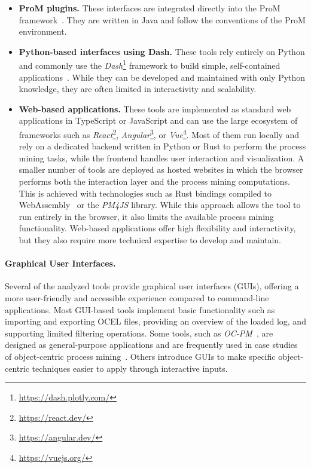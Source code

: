 \begin{itemize}
	\item \textbf{ProM plugins.}
	      These interfaces are integrated directly into the ProM framework~\cite{prom, oclpm, constraintchecking}.
	      They are written in Java and follow the conventions of the ProM environment.
	\item \textbf{Python-based interfaces using Dash.}
	      These tools rely entirely on Python and commonly use the \textit{Dash}\footnote{\url{https://dash.plotly.com/}} framework to build simple, self-contained applications~\cite{qrpm, ocpm}.
	      While they can be developed and maintained with only Python knowledge, they are often limited in interactivity and scalability.
	\item \textbf{Web-based applications.}
	      These tools are implemented as standard web applications in TypeScript or JavaScript and can use the large ecosystem of frameworks such as \textit{React}\footnote{\url{https://react.dev/}}, \textit{Angular}\footnote{\url{https://angular.dev/}}, or \textit{Vue}\footnote{\url{https://vuejs.org/}}. Most of them run locally and rely on a dedicated backend written in Python or Rust to perform the process mining tasks, while the frontend handles user interaction and visualization.
	      A smaller number of tools are deployed as hosted websites in which the browser performs both the interaction layer and the process mining computations. This is achieved with technologies such as Rust bindings compiled to WebAssembly~\cite{rust4pm} or the \textit{PM4JS} library. While this approach allows the tool to run entirely in the browser, it also limits the available process mining functionality.
	      Web-based applications offer high flexibility and interactivity, but they also require more technical expertise to develop and maintain.
\end{itemize}

\paragraph{Graphical User Interfaces.}

Several of the analyzed tools provide graphical user interfaces (GUIs), offering a more user-friendly and accessible experience compared to command-line applications. Most GUI-based tools implement basic functionality such as importing and exporting OCEL files, providing an overview of the loaded log, and supporting limited filtering operations. Some tools, such as \textit{OC-PM}~\cite{ocpm}, are designed as general-purpose applications and are frequently used in case studies of object-centric process mining~\cite{casestudy1}. Others introduce GUIs to make specific object-centric techniques easier to apply through interactive inputs.

